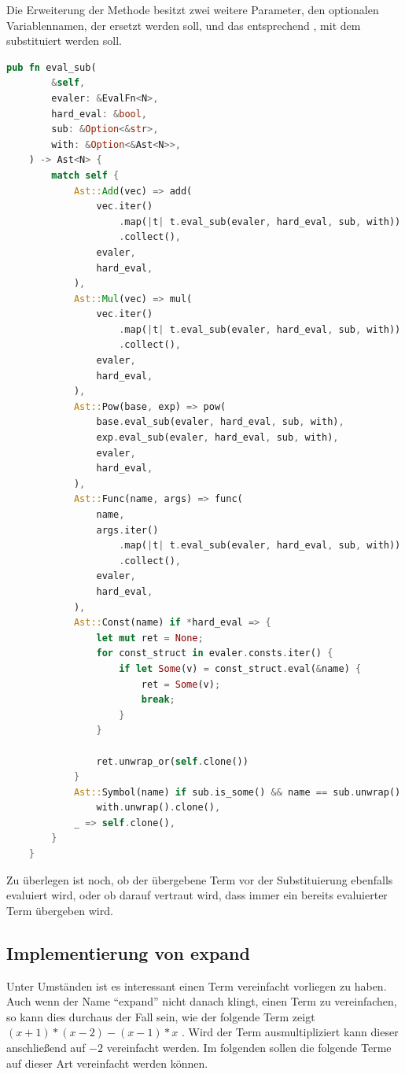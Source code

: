 \documentclass[11pt,a4paper, ngerman]{article}
\begin{document}
Die Erweiterung der Methode besitzt zwei weitere Parameter, den optionalen Variablennamen, der ersetzt werden soll, und das entsprechend , mit dem substituiert werden soll.
\begin{lstlisting}[language=rust, caption={Erweiterung pub fn eval}]
    pub fn eval_sub(
        &self,
        evaler: &EvalFn<N>,
        hard_eval: &bool,
        sub: &Option<&str>,
        with: &Option<&Ast<N>>,
    ) -> Ast<N> {
        match self {
            Ast::Add(vec) => add(
                vec.iter()
                    .map(|t| t.eval_sub(evaler, hard_eval, sub, with))
                    .collect(),
                evaler,
                hard_eval,
            ),
            Ast::Mul(vec) => mul(
                vec.iter()
                    .map(|t| t.eval_sub(evaler, hard_eval, sub, with))
                    .collect(),
                evaler,
                hard_eval,
            ),
            Ast::Pow(base, exp) => pow(
                base.eval_sub(evaler, hard_eval, sub, with),
                exp.eval_sub(evaler, hard_eval, sub, with),
                evaler,
                hard_eval,
            ),
            Ast::Func(name, args) => func(
                name,
                args.iter()
                    .map(|t| t.eval_sub(evaler, hard_eval, sub, with))
                    .collect(),
                evaler,
                hard_eval,
            ),
            Ast::Const(name) if *hard_eval => {
                let mut ret = None;
                for const_struct in evaler.consts.iter() {
                    if let Some(v) = const_struct.eval(&name) {
                        ret = Some(v);
                        break;
                    }
                }

                ret.unwrap_or(self.clone())
            }
            Ast::Symbol(name) if sub.is_some() && name == sub.unwrap() => 
                with.unwrap().clone(),
            _ => self.clone(),
        }
    }
\end{lstlisting}

Zu überlegen ist noch, ob der übergebene Term vor der Substituierung ebenfalls evaluiert wird, oder ob darauf vertraut wird, dass immer ein bereits evaluierter Term übergeben wird.

\subsection{Implementierung von expand}
Unter Umständen ist es interessant einen Term vereinfacht vorliegen zu haben. Auch wenn der Name ``expand'' nicht danach klingt, einen Term zu vereinfachen, so kann dies durchaus der Fall sein, wie der folgende Term zeigt $(x + 1)*(x - 2) - (x - 1)*x$ \cite{SymPyExpand}. Wird der Term ausmultipliziert kann dieser anschließend auf $-2$ vereinfacht werden. Im folgenden sollen die folgende Terme auf dieser Art vereinfacht werden können.
\end{document}
